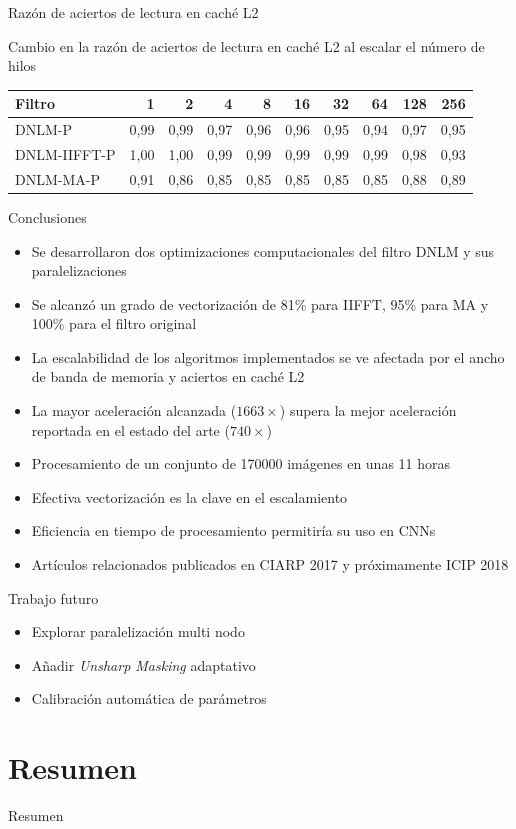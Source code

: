 \documentclass[15pt]{beamer} %
\begin{document}
\begin{frame}{Raz\'on de aciertos de lectura en cach\'e L2}
  
  \begin{center}
  \setlength\tabcolsep{2.5pt}
   \setlength{\textfloatsep}{25mm}
    {\footnotesize Cambio en la raz\'on de aciertos de lectura en cach\'e L2 al escalar el n\'umero de hilos}
    \begin{tabular}{lrrrrrrrrr}
	 Filtro & 1 & 2 & 4 & 8 & 16 & 32 & 64 & 128 & 256 \tabularnewline
	\hline
	DNLM-P & 0,99 & 0,99 & 0,97 & 0,96 & 0,96 & 0,95 & 0,94 & 0,97 & 0,95 \tabularnewline
	DNLM-IIFFT-P & 1,00 & 1,00 & 0,99 & 0,99 & 0,99 & 0,99 & 0,99 & 0,98 & 0,93 \tabularnewline
	DNLM-MA-P & 0,91 & 0,86 & 0,85 & 0,85 & 0,85 & 0,85 & 0,85 & 0,88 & 0,89 \tabularnewline
	\end{tabular}
  \end{center}
\end{frame}




\begin{frame}{Conclusiones}
  
  \begin{itemize}
  \item Se desarrollaron dos optimizaciones computacionales del filtro DNLM y sus paralelizaciones
  \item Se alcanz\'o un grado de vectorizaci\'on de 81\% para IIFFT, 95\% para MA y 100\% para el filtro original
  \item La escalabilidad de los algoritmos implementados se ve afectada por el ancho de banda de memoria y aciertos en cach\'e L2
  \item La mayor aceleraci\'on alcanzada ($1663\times$) supera la mejor aceleraci\'on reportada en el estado del arte ($740\times$)
  \item Procesamiento de un conjunto de 170000 im\'agenes en unas 11 horas
  \item Efectiva vectorizaci\'on es la clave en el escalamiento
  \item Eficiencia en tiempo de procesamiento permitir\'ia su uso en CNNs
  \item Art\'iculos relacionados publicados en CIARP 2017 y pr\'oximamente ICIP 2018
  \end{itemize}
  
\end{frame}

\begin{frame}{Trabajo futuro}
  
  \begin{itemize}
  \item Explorar paralelizaci\'on multi nodo 
  \item A\~nadir \textit{Unsharp Masking} adaptativo
  \item Calibraci\'on automática de par\'ametros
  \end{itemize}
  
\end{frame}


\section{Resumen}

\begin{frame}{Resumen}
  \tableofcontents
\end{frame}
\end{document}
